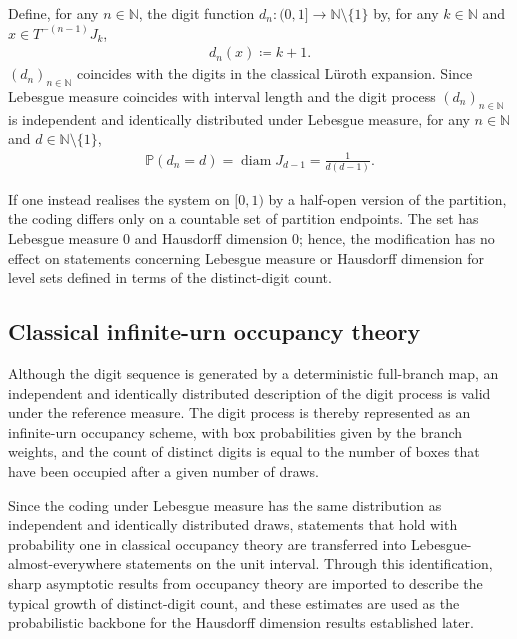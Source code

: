 \documentclass[12pt,reqno]{amsart}
\theoremstyle{definition}
\theoremstyle{plain}
\begin{document}
Define, for any $n\in\mathbb{N}$, the digit function $d_n:(0,1]\to\mathbb{N}\setminus\{1\}$ by, for any $k\in\mathbb{N}$ and $x\in T^{-(n-1)}J_k$,
\begin{align*}
    d_n(x)\coloneqq k+1.
\end{align*}
$(d_n)_{n\in\mathbb{N}}$ coincides with the digits in the classical L\"uroth expansion. Since Lebesgue measure coincides with interval length and the digit process $(d_n)_{n\in\mathbb N}$ is independent and identically distributed under Lebesgue measure, for any $n\in\mathbb{N}$ and $d\in\mathbb{N}\setminus\{1\}$,
\begin{align*}
    \mathbb P(d_n=d)=\operatorname{diam}{J_{d-1}}=\frac{1}{d(d-1)}.
\end{align*}

If one instead realises the system on $[0,1)$ by a half-open version of the partition, the coding differs only on a countable set of partition endpoints. The set has Lebesgue measure $0$ and Hausdorff dimension $0$; hence, the modification has no effect on statements concerning Lebesgue measure or Hausdorff dimension for level sets defined in terms of the distinct-digit count.

\subsection{Classical infinite-urn occupancy theory}

Although the digit sequence is generated by a deterministic full-branch map, an independent and identically distributed description of the digit process is valid under the reference measure. The digit process is thereby represented as an infinite-urn occupancy scheme, with box probabilities given by the branch weights, and the count of distinct digits is equal to the number of boxes that have been occupied after a given number of draws.

Since the coding under Lebesgue measure has the same distribution as independent and identically distributed draws, statements that hold with probability one in classical occupancy theory are transferred into Lebesgue-almost-everywhere statements on the unit interval. Through this identification, sharp asymptotic results from occupancy theory are imported to describe the typical growth of distinct-digit count, and these estimates are used as the probabilistic backbone for the Hausdorff dimension results established later.
\end{document}
